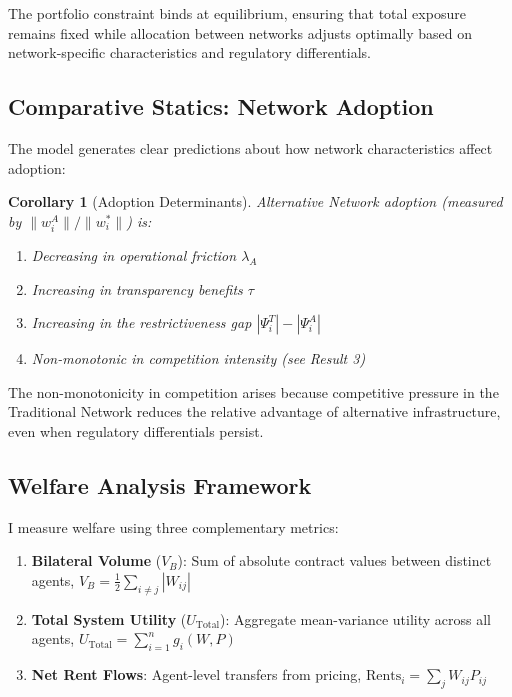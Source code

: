 \documentclass[12pt]{article}
\newtheorem{corollary}[theorem]{Corollary}
\begin{document}
The portfolio constraint binds at equilibrium, ensuring that total exposure remains fixed while allocation between networks adjusts optimally based on network-specific characteristics and regulatory differentials.

\subsection{Comparative Statics: Network Adoption}

The model generates clear predictions about how network characteristics affect adoption:

\begin{corollary}[Adoption Determinants]
Alternative Network adoption (measured by $\|w_i^A\| / \|w_i^*\|$) is:
\begin{enumerate}[noitemsep]
    \item Decreasing in operational friction $\lambda_A$
    \item Increasing in transparency benefits $\tau$
    \item Increasing in the restrictiveness gap $|\Psi_i^T| - |\Psi_i^A|$
    \item Non-monotonic in competition intensity (see Result 3)
\end{enumerate}
\end{corollary}

The non-monotonicity in competition arises because competitive pressure in the Traditional Network reduces the relative advantage of alternative infrastructure, even when regulatory differentials persist.

\subsection{Welfare Analysis Framework}

I measure welfare using three complementary metrics:

\begin{enumerate}[noitemsep]
    \item \textbf{Bilateral Volume} ($V_B$): Sum of absolute contract values between distinct agents, $V_B = \frac{1}{2}\sum_{i \neq j} |W_{ij}|$
    
    \item \textbf{Total System Utility} ($U_{\text{Total}}$): Aggregate mean-variance utility across all agents, $U_{\text{Total}} = \sum_{i=1}^n g_i(W, P)$
    
    \item \textbf{Net Rent Flows}: Agent-level transfers from pricing, $\text{Rents}_i = \sum_j W_{ij} P_{ij}$
\end{enumerate}
\end{document}
